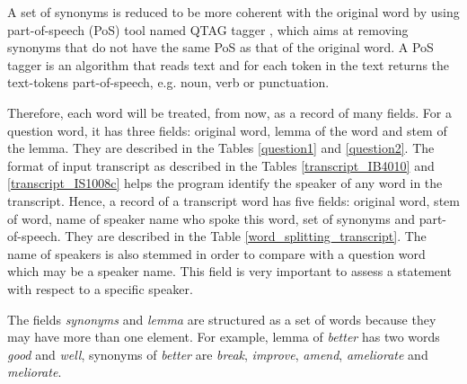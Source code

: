 A set of synonyms is reduced to be more coherent with the original word by using part-of-speech (PoS) tool named QTAG tagger \cite{manson1997qpp}, which aims at removing synonyms that do not have the same PoS as that of the original word. A PoS tagger is an algorithm that reads text and for each token in the text returns the text-tokens part-of-speech, e.g. noun, verb or punctuation. 

Therefore, each word will be treated, from now, as a record of many fields. For a question word, it has three fields: original word, lemma of the word and stem of the lemma. They are described in the Tables \ref{question1} and \ref{question2}. The format of input transcript as described in the Tables \ref{transcript_IB4010} and \ref{transcript_IS1008c} helps the program identify the speaker of any word in the transcript. Hence, a record of a transcript word has five fields: original word, stem of word, name of speaker name who spoke this word, set of synonyms and part-of-speech. They are described in the Table \ref{word_splitting_transcript}. The name of speakers is also stemmed in order to compare with a question word which may be a speaker name. This field is very important to assess a statement with respect to a specific speaker.

The fields \textit{synonyms} and \textit{lemma} are structured as a set of words because they may have more than one element. For example, lemma of \textit{better} has two words \textit{good} and \textit{well}, synonyms of \textit{better} are \textit{break}, \textit{improve}, \textit{amend}, \textit{ameliorate} and \textit{meliorate}.


